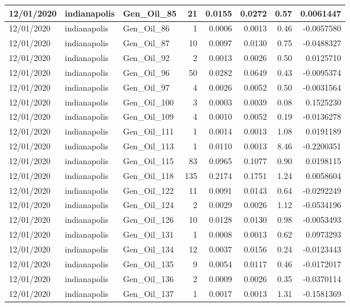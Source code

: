 \documentclass[
  letterpaper,
  DIV=11,
  numbers=noendperiod]{scrartcl}
\begin{document}
\begin{tabular}{l|l|l|r|r|r|r|r}
\hline
12/01/2020 & indianapolis & Gen\_Oil\_85 & 21 & 0.0155 & 0.0272 & 0.57 & 0.0061447\\
\hline
12/01/2020 & indianapolis & Gen\_Oil\_86 & 1 & 0.0006 & 0.0013 & 0.46 & -0.0057580\\
\hline
12/01/2020 & indianapolis & Gen\_Oil\_87 & 10 & 0.0097 & 0.0130 & 0.75 & -0.0488327\\
\hline
12/01/2020 & indianapolis & Gen\_Oil\_92 & 2 & 0.0013 & 0.0026 & 0.50 & 0.0125710\\
\hline
12/01/2020 & indianapolis & Gen\_Oil\_96 & 50 & 0.0282 & 0.0649 & 0.43 & -0.0095374\\
\hline
12/01/2020 & indianapolis & Gen\_Oil\_97 & 4 & 0.0026 & 0.0052 & 0.50 & -0.0031564\\
\hline
12/01/2020 & indianapolis & Gen\_Oil\_100 & 3 & 0.0003 & 0.0039 & 0.08 & 0.1525230\\
\hline
12/01/2020 & indianapolis & Gen\_Oil\_109 & 4 & 0.0010 & 0.0052 & 0.19 & -0.0136278\\
\hline
12/01/2020 & indianapolis & Gen\_Oil\_111 & 1 & 0.0014 & 0.0013 & 1.08 & 0.0191189\\
\hline
12/01/2020 & indianapolis & Gen\_Oil\_113 & 1 & 0.0110 & 0.0013 & 8.46 & -0.2200351\\
\hline
12/01/2020 & indianapolis & Gen\_Oil\_115 & 83 & 0.0965 & 0.1077 & 0.90 & 0.0198115\\
\hline
12/01/2020 & indianapolis & Gen\_Oil\_118 & 135 & 0.2174 & 0.1751 & 1.24 & 0.0058604\\
\hline
12/01/2020 & indianapolis & Gen\_Oil\_122 & 11 & 0.0091 & 0.0143 & 0.64 & -0.0292249\\
\hline
12/01/2020 & indianapolis & Gen\_Oil\_124 & 2 & 0.0029 & 0.0026 & 1.12 & -0.0534196\\
\hline
12/01/2020 & indianapolis & Gen\_Oil\_126 & 10 & 0.0128 & 0.0130 & 0.98 & -0.0053493\\
\hline
12/01/2020 & indianapolis & Gen\_Oil\_131 & 1 & 0.0008 & 0.0013 & 0.62 & 0.0973293\\
\hline
12/01/2020 & indianapolis & Gen\_Oil\_134 & 12 & 0.0037 & 0.0156 & 0.24 & -0.0123443\\
\hline
12/01/2020 & indianapolis & Gen\_Oil\_135 & 9 & 0.0054 & 0.0117 & 0.46 & -0.0172017\\
\hline
12/01/2020 & indianapolis & Gen\_Oil\_136 & 2 & 0.0009 & 0.0026 & 0.35 & -0.0370114\\
\hline
12/01/2020 & indianapolis & Gen\_Oil\_137 & 1 & 0.0017 & 0.0013 & 1.31 & -0.1581369\\

\end{tabular}
\end{document}
